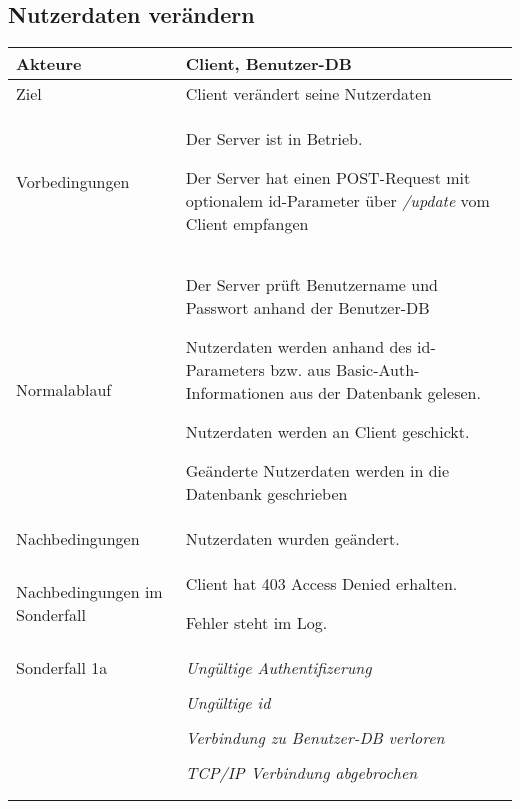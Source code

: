 \documentclass[a4paper,10pt,titlepage]{article}
\makeatletter
\newcommand\novspace{\@minipagetrue}
\newenvironment{owncompactitem}{%
\compactitem
}{%
\@finalstrut\@arstrutbox
\@nameuse{endcompactitem}%
\aftergroup\let\aftergroup\@finalstrut\aftergroup\@gobble
}
\newenvironment{owncompactenum}{%
\compactenum
}{%
\@finalstrut\@arstrutbox
\@nameuse{endcompactenum}%
\aftergroup\let\aftergroup\@finalstrut\aftergroup\@gobble
}
\newcommand{\usecase}[7]
{\subsection{#1}
\setlength{\extrarowheight}{2pt}
\begin{tabular}{|p{0.2\textwidth}|p{0.9\textwidth}|}
\hline
  Akteure & #2\\\hline
  Ziel & #3\\\hline
  Vorbedingungen & \novspace
  	\begin{owncompactitem}[-] #4 \end{owncompactitem} \\\hline
  Normalablauf & \vspace{-7pt}
  	\begin{owncompactenum}[1.] #6 \end{owncompactenum} \\\hline
  Nachbedingungen & \novspace
  	\begin{owncompactitem}[-] #5 \end{owncompactitem} \\\hline
  #7
\end{tabular}
}
\newcommand{\sonderfall}[4][\empty]
{
Sonderfall #2 & \vspace{-10pt}
	\textit{#3}
	\begin{owncompactenum}[{#2}.1] {#4} \end{owncompactenum}
  	\ifthenelse{\equal{#1}{\empty}}
    	{\\\hline} %
    	{\ensuremath{\rightarrow} #1 \\ [+1pt] \hline} %

}
\newcommand{\sondernachbedingung}[1]
{
Nachbedingungen im Sonderfall& \novspace
	\begin{owncompactitem}[-]
		#1
	\end{owncompactitem} \\\hline
}
\makeatother
\begin{document}
\usecase{Nutzerdaten verändern}{Client, Benutzer-DB}%
{Client verändert seine Nutzerdaten}%
{%
  \item Der Server ist in Betrieb.
  \item Der Server hat einen POST-Request mit optionalem id-Parameter über \textit{/update} vom Client empfangen
}
{%
  \item Nutzerdaten wurden geändert.
}
{%
  \item Der Server prüft Benutzername und Passwort anhand der Benutzer-DB
  \item Nutzerdaten werden anhand des id-Parameters bzw. aus Basic-Auth-Informationen aus der Datenbank gelesen.
  \item Nutzerdaten werden an Client geschickt.
  \item Geänderte Nutzerdaten werden in die Datenbank geschrieben
}
{%
  \sondernachbedingung{
	\item Client hat 403 Access Denied erhalten.
	\item Fehler steht im Log.
	}
	
	\sonderfall[Weiter mit normalem Betrieb]{1a}
    {Ungültige Authentifizerung}
    {
    \item Fehler wird ins Log geschrieben
  	\item Der Client erhält eine entsprechende Fehlermeldung mit HTTP-Status 403 Access Denied
    }
    
   	\sonderfall[Weiter mit normalem Betrieb]{2a}
    {Ungültige id}
    {
    \item Fehler wird ins Log geschrieben
  	\item Der Client erhält eine entsprechende Fehlermeldung
    }

	 \sonderfall[Kritischer Fehler, Server ist beendet]{*}%
	{Verbindung zu Benutzer-DB verloren}%
  	{
	\item Der Fehler wird ins Log geschrieben (als schwerwiegender Fehler)
	\item Der Client erhält eine entsprechende Fehlermeldung
	\item Der Server wird beendet
  	}

\sonderfall[Weiter mit normalem Betrieb]{**}%
	{TCP/IP Verbindung abgebrochen}%
	{
	\item Fehlermeldung wird ins Log geschrieben
	}
}
\end{document}
